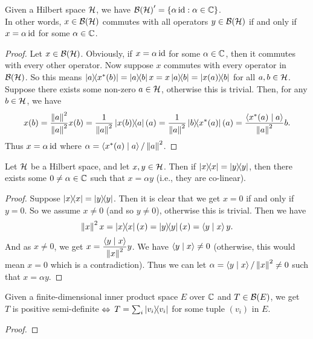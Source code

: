  \begin{lemma}\label{ContinuousLinearMap.centralizer}\leanok
  Given a Hilbert space $\mathcal{H}$, we have ${\mathcal{B}(\mathcal{H})}^\prime=\{\alpha\operatorname{id}:\alpha\in\mathbb{C}\}$.\\
  In other words, $x\in\mathcal{B}(\mathcal{H})$ commutes with all operators $y\in\mathcal{B}(\mathcal{H})$ if and only if $x=\alpha\operatorname{id}$ for some $\alpha\in\mathbb{C}$.
 \end{lemma}
 \begin{proof}\leanok
  Let $x\in\mathcal{B}(\mathcal{H})$. Obviously, if $x=\alpha\operatorname{id}$ for some $\alpha\in\mathbb{C}$, then it commutes with every other operator. Now suppose $x$ commutes with every operator in $\mathcal{B}(\mathcal{H})$.
  So this means $\ketbra{a}{x^*(b)}=\ketbra{a}{b}x=x\ketbra{a}{b}=\ketbra{x(a)}{b}$ for all $a,b\in\mathcal{H}$.
  Suppose there exists some non-zero $a\in\mathcal{H}$, otherwise this is trivial. Then, for any $b\in\mathcal{H}$, we have
  \[x(b)=\frac{\left\|a\right\|^2}{\left\|a\right\|^2}x(b)=\frac{1}{\left\|a\right\|^2}\left\lvert x(b)\right\rangle\!\!\left\langle a\right\rvert(a)=\frac{1}{\left\|a\right\|^2}\left\lvert b\right\rangle\!\!\left\langle x^*(a)\right\rvert(a)=\frac{\left\langle x^*(a) \mid a\right\rangle}{\left\|a\right\|^2}b.\]
  Thus $x=\alpha\operatorname{id}$ where $\alpha=\left\langle x^*(a) \mid a\right\rangle/\left\|a\right\|^2$.
 \end{proof}

 \begin{proposition}\label{colinear_of_rankOne_self_eq_rankOne_self}\leanok
  Let $\mathcal{H}$ be a Hilbert space, and let $x,y\in\mathcal{H}$. Then if $\left\lvert x\right\rangle\!\!\left\langle x\right\rvert=\left\lvert y\right\rangle\!\!\left\langle y\right\rvert$, then there exists some $0\neq\alpha\in\mathbb{C}$ such that $x=\alpha{y}$ (i.e., they are co-linear).
 \end{proposition}
 \begin{proof}\leanok
  Suppose $\left\lvert x\right\rangle\!\!\left\langle x\right\rvert=\left\lvert y\right\rangle\!\!\left\langle y\right\rvert$. Then it is clear that we get $x=0$ if and only if $y=0$. So we assume $x\neq0$ (and so $y\neq0$), otherwise this is trivial.
  Then we have \[\left\|x\right\|^2x=\left\lvert x\right\rangle\!\!\left\langle x\right\rvert(x)=\left\lvert y\right\rangle\!\!\left\langle y\right\rvert(x)=\left\langle y \mid x\right\rangle y.\]
  And as $x\neq0$, we get $x=\dfrac{\left\langle y \mid x\right\rangle}{\left\|x\right\|^2}y$. We have $\left\langle y \mid x\right\rangle\neq0$ (otherwise, this would mean $x=0$ which is a contradiction). Thus we can let $\alpha=\left\langle y \mid x\right\rangle/\left\|x\right\|^2\neq0$ such that $x=\alpha{y}$.
 \end{proof}


 \begin{lemma}\label{LinearMap.isPositive_iff_eq_sum_rankOne}\leanok
  Given a finite-dimensional inner product space $E$ over $\mathbb{C}$ and $T\in\mathcal{B}(E)$, we get\\
  \hspace*{0.5cm}$T$ is positive semi-definite $\Leftrightarrow$ $T=\sum_i\left\lvert v_i\right\rangle\!\!\left\langle v_i\right\rvert$ for some tuple $(v_i)$ in $E$.
 \end{lemma}
 \begin{proof}
  
 \end{proof}

